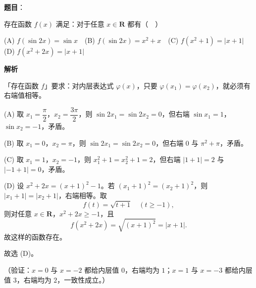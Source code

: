 \begin{answer}

\textbf{题目}：

存在函数 \(f(x)\) 满足：对于任意 \(x\in\mathbf{R}\) 都有（　）

(A) \(f(\sin 2x)=\sin x\)　(B) \(f(\sin 2x)=x^2+x\)　(C) \(f(x^2+1)=|x+1|\)　(D) \(f(x^2+2x)=|x+1|\)

\textbf{解析}

「存在函数 \(f\)」要求：对内层表达式 \(\varphi(x)\)，只要 \(\varphi(x_1)=\varphi(x_2)\)，就必须有右端值相等。

(A) 取 \(x_1=\dfrac{\pi}{2}\)，\(x_2=\dfrac{3\pi}{2}\)，则 \(\sin2x_1=\sin2x_2=0\)，但右端 \(\sin x_1=1\)，\(\sin x_2=-1\)，矛盾。

(B) 取 \(x_1=0\)，\(x_2=\pi\)，则 \(\sin2x_1=\sin2x_2=0\)，但右端 \(0\) 与 \(\pi^2+\pi\)，矛盾。

(C) 取 \(x_1=1\)，\(x_2=-1\)，则 \(x_1^2+1=x_2^2+1=2\)，但右端 \(|1+1|=2\) 与 \(|-1+1|=0\)，矛盾。

(D) 设 \(x^2+2x=(x+1)^2-1\)。若 \((x_1+1)^2=(x_2+1)^2\)，则 \(|x_1+1|=|x_2+1|\)，右端相等。取
\nopagebreak[4]
\[
f(t)=\sqrt{t+1}\quad(t\geqslant-1),
\]
则对任意 \(x\in\mathbf{R}\)，\(x^2+2x\geqslant-1\)，且
\nopagebreak[4]
\[
f(x^2+2x)=\sqrt{(x+1)^2}=|x+1|.
\]
故这样的函数存在。

故选 (D)。

（验证：\(x=0\) 与 \(x=-2\) 都给内层值 \(0\)，右端均为 \(1\)；\(x=1\) 与 \(x=-3\) 都给内层值 \(3\)，右端均为 \(2\)，一致性成立。）


\end{answer}
